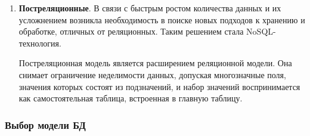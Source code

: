\begin{enumerate}[label*=\arabic*.]
	\item \textbf{Постреляционные}. 
	В связи с быстрым ростом количества данных и их усложнением
	возникла необходимость в поиске новых подходов к хранению и обработке, отличных от реляционных. Таким решением стала NoSQL-технология.
	
	Постреляционная модель является расширением реляционной
	модели. Она снимает ограничение неделимости данных, допуская
	многозначные поля, значения которых состоят из подзначений,
	и набор значений воспринимается как самостоятельная таблица,
	встроенная в главную таблицу.
	
\end{enumerate}



\subsubsection{Выбор модели БД}





\pagebreak